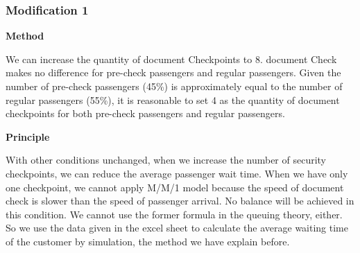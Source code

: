 \documentclass{mcmthesis}
\begin{document}
\subsubsection*{Modification 1} 
\par \textbf{Method}
\par We can increase the quantity of document Checkpoints to 8. document Check makes no difference for pre-check passengers and regular passengers. Given the number of pre-check passengers (45\%) is approximately equal to the number of regular passengers (55\%), it is reasonable to set 4 as the quantity of document checkpoints for both pre-check passengers and regular passengers. 
\par \textbf{Principle}
\par With other conditions unchanged, when we increase the number of security checkpoints, we can reduce the average passenger wait time. When we have only one checkpoint, we cannot apply M/M/1 model because the speed of document check is slower than the speed of passenger arrival. No balance will be achieved in this condition. We cannot use the former formula in the queuing theory, either. So we use the data given in the excel sheet to calculate the average waiting time of the customer by simulation, the method we have explain before.
\end{document}

